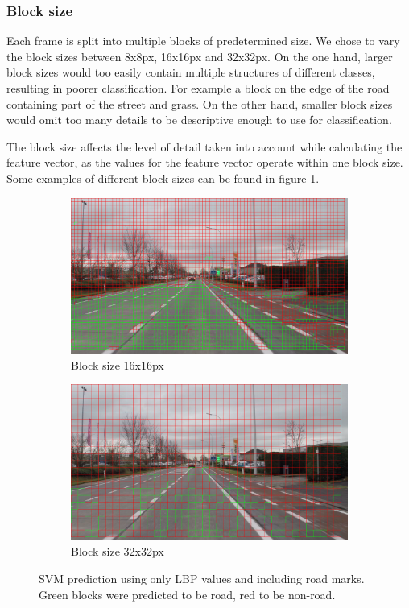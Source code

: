 \documentclass[runningheads,a4paper]{llncs}
\begin{document}
\subsubsection{Block size}
Each frame is split into multiple blocks of predetermined size. We chose to vary the block sizes between 8x8px, 16x16px and 32x32px. On the one hand, larger block sizes would too easily contain multiple structures of different classes, resulting in poorer classification. For example a block on the edge of the road containing part of the street and grass. On the other hand, smaller block sizes would omit too many details to be descriptive enough to use for classification.

The block size affects the level of detail taken into account while calculating the feature vector, as the values for the feature vector operate within one block size. Some examples of different block sizes can be found in figure \ref{fig:methods-block-sizes}.

\begin{figure}[ht]
\centering
\begin{subfigure}{.49\textwidth}
  \centering
  \includegraphics[width=1\textwidth]{fig/svm_prediction_16_lbp_marks.png}
  \caption{Block size 16x16px}
\end{subfigure}
\begin{subfigure}{.49\textwidth}
  \centering
  \includegraphics[width=1\textwidth]{fig/svm_prediction_32_lbp_marks.png}
  \caption{Block size 32x32px}
\end{subfigure}
\caption{SVM prediction using only LBP values and including road marks. Green blocks were predicted to be road, red to be non-road.}
\label{fig:methods-block-sizes}
\end{figure}
\end{document}
